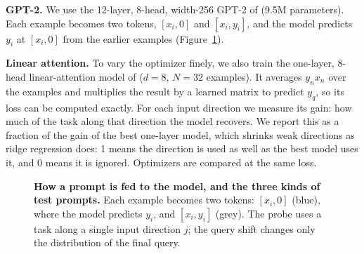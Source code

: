 \documentclass{article}
\begin{document}
\textbf{GPT-2.} We use the 12-layer, 8-head, width-256 GPT-2 of \citet{garg2022} (9.5M parameters). Each example becomes two tokens, $[x_i, 0]$ and $[x_i, y_i]$, and the model predicts $y_i$ at $[x_i, 0]$ from the earlier examples (Figure~\ref{fig:setup}).

\textbf{Linear attention.} To vary the optimizer finely, we also train the one-layer, 8-head linear-attention model of \citet{zhang2025training} ($d = 8$, $N = 32$ examples). It averages $y_n x_n$ over the examples and multiplies the result by a learned matrix to predict $y_q$, so its loss can be computed exactly. For each input direction we measure its gain: how much of the task along that direction the model recovers. We report this as a fraction of the gain of the best one-layer model, which shrinks weak directions as ridge regression does: 1 means the direction is used as well as the best model uses it, and 0 means it is ignored. Optimizers are compared at the same loss.

\begin{figure}[!t]
\centering
{}
\caption{\textbf{How a prompt is fed to the model, and the three kinds of test prompts.} Each example becomes two tokens: $[x_i,0]$ (blue), where the model predicts $y_i$, and $[x_i,y_i]$ (grey). The probe uses a task along a single input direction $j$; the query shift changes only the distribution of the final query.}
\label{fig:setup}
\end{figure}
\end{document}
